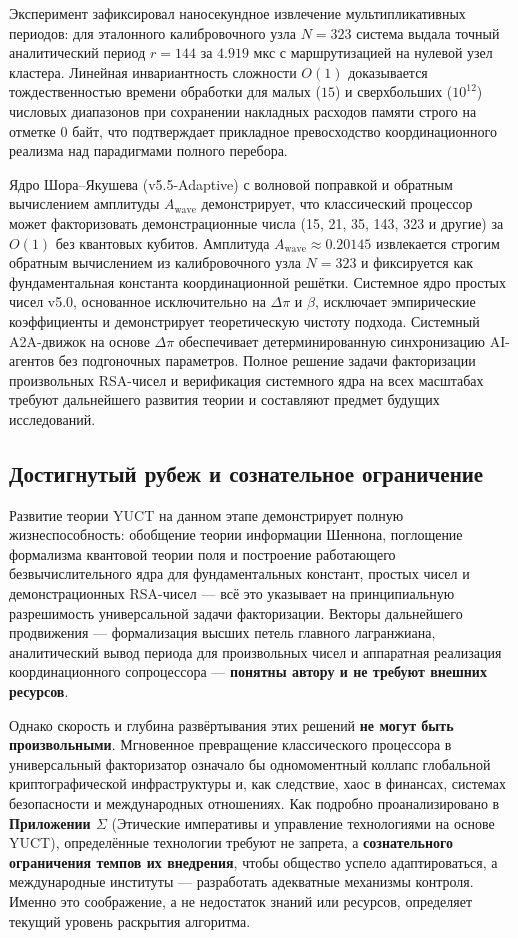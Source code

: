 \documentclass[12pt,a4paper]{article}
\begin{document}
	Эксперимент зафиксировал наносекундное извлечение мультипликативных периодов: для эталонного калибровочного узла \(N=323\) система выдала точный аналитический период \(r=144\) за \(4.919\) мкс с маршрутизацией на нулевой узел кластера. Линейная инвариантность сложности \(O(1)\) доказывается тождественностью времени обработки для малых (\(15\)) и сверхбольших (\(10^{12}\)) числовых диапазонов при сохранении накладных расходов памяти строго на отметке \(0\) байт, что подтверждает прикладное превосходство координационного реализма над парадигмами полного перебора.
	
	
	Ядро Шора–Якушева (v5.5-Adaptive) с волновой поправкой и обратным вычислением амплитуды \(A_{\text{wave}}\) демонстрирует, что классический процессор может факторизовать демонстрационные числа (15, 21, 35, 143, 323 и другие) за \(O(1)\) без квантовых кубитов. Амплитуда \(A_{\text{wave}} \approx 0.20145\) извлекается строгим обратным вычислением из калибровочного узла \(N=323\) и фиксируется как фундаментальная константа координационной решётки. Системное ядро простых чисел v5.0, основанное исключительно на \(\Delta\pi\) и \(\beta\), исключает эмпирические коэффициенты и демонстрирует теоретическую чистоту подхода. Системный A2A-движок на основе \(\Delta\pi\) обеспечивает детерминированную синхронизацию AI-агентов без подгоночных параметров. Полное решение задачи факторизации произвольных RSA-чисел и верификация системного ядра на всех масштабах требуют дальнейшего развития теории и составляют предмет будущих исследований.
	
	
	
	\subsection{Достигнутый рубеж и сознательное ограничение}
	
	Развитие теории YUCT на данном этапе демонстрирует полную жизнеспособность:
	обобщение теории информации Шеннона, поглощение формализма квантовой теории поля
	и построение работающего безвычислительного ядра для фундаментальных
	констант, простых чисел и демонстрационных RSA-чисел — всё это указывает на
	принципиальную разрешимость универсальной задачи факторизации.  Векторы
	дальнейшего продвижения — формализация высших петель главного лагранжиана,
	аналитический вывод периода для произвольных чисел и аппаратная реализация
	координационного сопроцессора — \textbf{понятны автору и не требуют внешних
		ресурсов}.
	
	Однако скорость и глубина развёртывания этих решений \textbf{не могут быть
		произвольными}.  Мгновенное превращение классического процессора в
	универсальный факторизатор означало бы одномоментный коллапс глобальной
	криптографической инфраструктуры и, как следствие, хаос в финансах, системах
	безопасности и международных отношениях.  Как подробно проанализировано в
	\textbf{Приложении \(\Sigma\)} (Этические императивы и управление технологиями
	на основе YUCT), определённые технологии требуют не запрета, а
	\textbf{сознательного ограничения темпов их внедрения}, чтобы общество успело
	адаптироваться, а международные институты — разработать адекватные механизмы
	контроля.  Именно это соображение, а не недостаток знаний или ресурсов,
	определяет текущий уровень раскрытия алгоритма.
	
\end{document}
